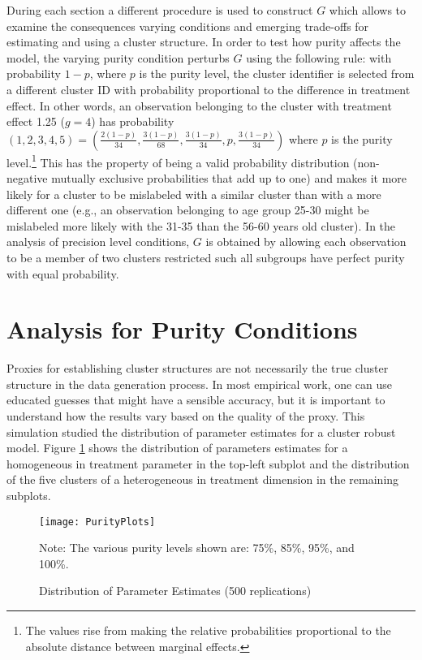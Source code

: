 \documentclass{jbsc}
\begin{document}
During each section a different procedure is used to construct $G$ which allows to examine the consequences varying conditions and emerging trade-offs for estimating and using a cluster structure. In order to test how purity affects the model, the varying purity condition perturbs $G$ using the following rule: with probability $1 - p$, where $p$ is the purity level, the cluster identifier is selected from a different cluster ID with probability proportional to the difference in treatment effect. In other words, an observation belonging to the cluster with treatment effect 1.25 ($g = 4$) has probability $\left(1,2,3,4,5\right) = \left(\frac{2(1 - p)}{34}, \frac{3(1 - p)}{68}, \frac{3(1 - p)}{34}, p, \frac{3(1 - p)}{34}\right)$ where $p$ is the purity level.\footnote{The values rise from making the relative probabilities proportional to the absolute distance between marginal effects.} This has the property of being a valid probability distribution (non-negative mutually exclusive probabilities that add up to one) and makes it more likely for a cluster to be mislabeled with a similar cluster than with a more different one (e.g., an observation belonging to age group 25-30 might be mislabeled more likely with the 31-35 than the 56-60 years old cluster). In the analysis of precision level conditions, $G$ is obtained by allowing each observation to be a member of two clusters restricted such all subgroups have perfect purity with equal probability.

\FloatBarrier
\section{Analysis for Purity Conditions}

Proxies for establishing cluster structures are not necessarily the true cluster structure in the data generation process. In most empirical work, one can use educated guesses that might have a sensible accuracy, but it is important to understand how the results vary based on the quality of the proxy. This simulation studied the distribution of parameter estimates for a cluster robust model. Figure \ref{PurityLevels} shows the distribution of parameters estimates for a homogeneous in treatment parameter in the top-left subplot and the distribution of the five clusters of a heterogeneous in treatment dimension in the remaining subplots.


\begin{figure}[hbpt]
	\texttt{[image: PurityPlots]}
	\caption{Distribution of Parameter Estimates (500 replications)}
	\label{PurityLevels}
	{\footnotesize Note: The various purity levels shown are: 75\%, 85\%, 95\%, and 100\%.}
\end{figure}
\end{document}
